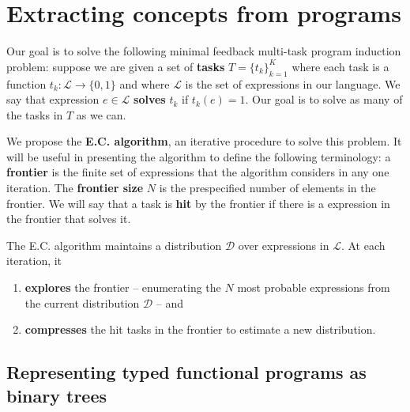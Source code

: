 \documentclass{article}
\begin{document}


\section{Extracting concepts from programs}

Our goal is to solve the following minimal feedback multi-task program
induction problem: suppose we are given a set of \textbf{tasks}
$T=\{t_k\}_{k=1}^K$ where each task is a function $t_k : \mathcal{L}
\rightarrow \{0, 1\}$ and where $\mathcal{L}$ is the set of
expressions in our language.  We say that expression $ e \in
\mathcal{L}$ \textbf{solves} $t_k$ if $ t_k(e) = 1$. Our goal is to
solve as many of the tasks in $T$ as we can.

We propose the \textbf{E.C. algorithm}, an iterative procedure to solve this
problem. It will be useful in presenting the algorithm to define the
following terminology: a \textbf{frontier} is the finite set of
expressions that the algorithm considers in any one iteration. The
\textbf{frontier size} $N$ is the prespecified number of elements in
the frontier. We will say that a task is \textbf{hit} by the frontier
if there is a expression in the frontier that solves it.

The E.C. algorithm maintains a distribution $\mathcal{D}$ over
expressions in $\mathcal{L}$. At each iteration, it
\begin{enumerate}
\item \textbf{explores} the frontier -- enumerating the $N$ most probable expressions
  from the current distribution $\mathcal{D}$ -- and
\item \textbf{compresses} the hit tasks in the frontier to estimate a new
  distribution.
\end{enumerate}

\subsection{Representing typed functional programs as binary trees}
\end{document}
